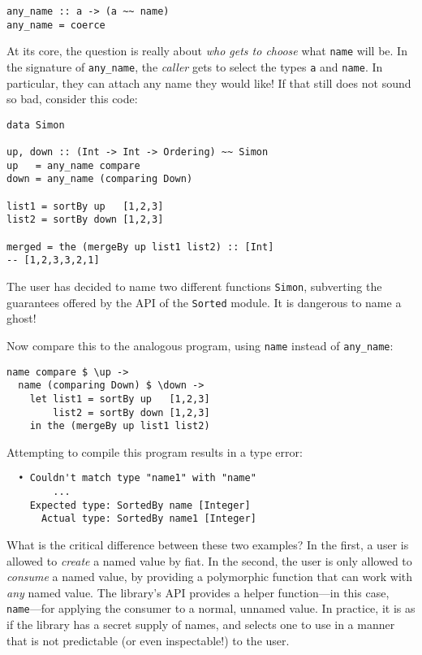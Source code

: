 \documentclass[format=sigplan, review=false, screen=true, 10pt]{acmart}
\begin{document}
\begin{verbatim}
any_name :: a -> (a ~~ name)
any_name = coerce
\end{verbatim}

At its core, the question is really about \emph{who gets to choose} what \texttt{name} will be.
In the signature of \texttt{any\_name}, the \emph{caller} gets to select the types \texttt{a}
and \texttt{name}. In particular, they can attach any name they would like!
If that still does not sound so bad, consider this code:

\begin{verbatim}
data Simon
  
up, down :: (Int -> Int -> Ordering) ~~ Simon
up   = any_name compare
down = any_name (comparing Down)

list1 = sortBy up   [1,2,3]
list2 = sortBy down [1,2,3]

merged = the (mergeBy up list1 list2) :: [Int]
-- [1,2,3,3,2,1]
\end{verbatim}
\noindent
The user has decided to name two different functions \texttt{Simon}, subverting the
guarantees offered by the API of the \texttt{Sorted} module. It is dangerous to
name a ghost!

Now compare this to the analogous program, using \texttt{name} instead of \texttt{any\_name}:
\begin{verbatim}
name compare $ \up ->
  name (comparing Down) $ \down ->
    let list1 = sortBy up   [1,2,3]
        list2 = sortBy down [1,2,3]
    in the (mergeBy up list1 list2)
\end{verbatim}
\noindent
Attempting to compile this program results in a type error:

\begin{lstlisting}
  • Couldn't match type "name1" with "name"
        ...
    Expected type: SortedBy name [Integer]
      Actual type: SortedBy name1 [Integer]
\end{lstlisting}
\noindent
What is the critical difference between these two examples? In the first, a user is
allowed to \emph{create} a named value by fiat. In the second, the user is only allowed to \emph{consume} a named value, by
providing a polymorphic function that can work with \emph{any} named value. The library's API provides
a helper function---in this case, \texttt{name}---for applying the consumer to a normal, unnamed value.
In practice, it is as if the
library has a secret supply of names, and selects one to use in a manner that is not
predictable (or even inspectable!) to the user.
\end{document}
